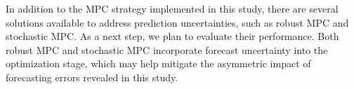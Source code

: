 In addition to the MPC strategy implemented in this study, there are several solutions available to address prediction uncertainties, such as robust MPC and stochastic MPC. As a next step, we plan to evaluate their performance. Both robust MPC and stochastic MPC incorporate forecast uncertainty into the optimization stage, which may help mitigate the asymmetric impact of forecasting errors revealed in this study.
